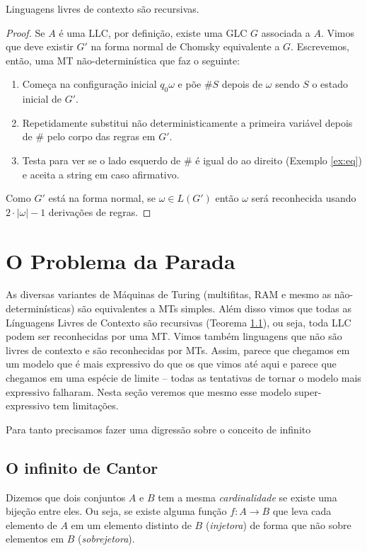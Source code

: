 \begin{theorem}
  Linguagens livres de contexto são recursivas.
\end{theorem}
\begin{proof}
  Se $A$ é uma LLC, por definição, existe uma GLC $G$ associada a $A$.
  Vimos que deve existir $G'$ na forma normal de Chomsky equivalente a $G$.
  Escrevemos, então, uma MT não-determinística que faz o seguinte:
  \begin{enumerate}
    \item Começa na configuração inicial $q_0\omega$ e põe $\#S$ depois de $\omega$ sendo $S$ o estado inicial de $G'$.
    \item Repetidamente substitui não deterministicamente a primeira variável depois de $\#$ pelo corpo das regras em $G'$.
    \item Testa para ver se o lado esquerdo de $\#$ é igual do ao direito (Exemplo \ref{ex:eq}) e aceita a string em caso afirmativo.
    \end{enumerate}
  Como $G'$ está na forma normal, se $\omega \in L(G')$ então $\omega$ será reconhecida usando $2\cdot|\omega| - 1$ derivações de regras.
\end{proof}

\section{O Problema da Parada}
\label{sec:problema-parada}

As diversas variantes de Máquinas de Turing (multifitas, RAM e mesmo as não-determinísticas) são equivalentes a MTs simples.
Além disso vimos que todas as Línguagens Livres de Contexto são recursivas (Teorema \ref{}), ou seja, toda LLC podem ser reconhecidas por uma MT.
Vimos também linguagens que não são livres de contexto e são reconhecidas por MTs.
Assim, parece que chegamos em um modelo que é mais expressivo do que os que vimos até aqui e parece que chegamos em uma espécie de limite -- todas as tentativas de tornar o modelo mais expressivo falharam.
Nesta seção veremos que mesmo esse modelo super-expressivo tem limitações.

Para tanto precisamos fazer uma digressão sobre o conceito de infinito

\subsection{O infinito de Cantor}

Dizemos que dois conjuntos $A$ e $B$ tem a mesma {\em cardinalidade} se existe uma bijeção entre eles.
Ou seja, se existe alguma função $f: A \to B$ que leva cada elemento de $A$ em um elemento distinto de $B$ ({\em injetora}) de forma que não sobre elementos em $B$ ({\em sobrejetora}).

